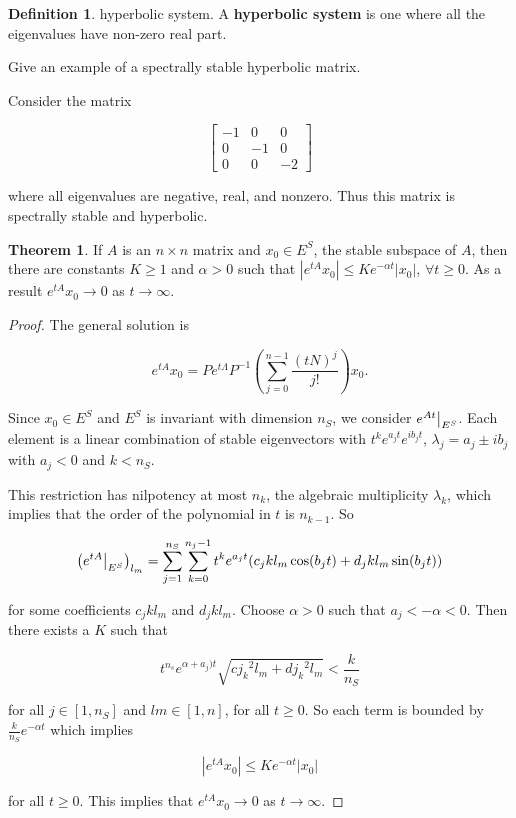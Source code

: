 \documentclass[12pt]{article}
\newcommand\restr[2]{{%
  \left.\kern-\nulldelimiterspace %
  #1 %
  \vphantom{\big|} %
  \right|_{#2} %
  }}
\theoremstyle{definition}
\newtheorem*{definition}{Definition}
\newtheorem{theorem}{Theorem}[section]  %
\begin{document}
\begin{definition} hyperbolic system.
A \textbf{hyperbolic system} is one where all the eigenvalues have non-zero real part.
\end{definition}


Give an example of a spectrally stable hyperbolic matrix.

Consider the matrix

\[
\begin{bmatrix}
-1 & 0 & 0 \\
0 & -1 & 0 \\
0 & 0 & -2
\end{bmatrix}
\]

where all eigenvalues are negative, real, and nonzero. Thus this matrix is spectrally stable and hyperbolic.


\begin{theorem}
If $A$ is an $n \times n$ matrix and $x_0 \in E^S$, the stable subspace of $A$, then
there are constants $K \geq 1$ and $\alpha > 0$ such that 
$|e^{tA} x_0| \leq Ke^{-\alpha t}|x_0|$,  $\forall t \geq 0$. As a result
$e^{tA}x_0 \rightarrow 0$ as $t \rightarrow \infty$.
\end{theorem}


\begin{proof}

The general solution is 

\[
e^{tA}x_0 = P e^{t \Lambda} P^{-1} \left( \sum_{j = 0}^{n-1} \frac{(tN)^j}{j!} \right) x_0.
\]

Since $x_0 \in E^S$ and $E^S$ is invariant with dimension $n_S$, we consider $\restr{e^{At}}{E^S}$.
Each element is a linear combination of stable eigenvectors with $t^k e^{a_j t} e^{ib_j t}$,
$\lambda_j = a_j \pm ib_j$ with $a_j < 0$ and $k < n_S$.

This restriction has nilpotency at most $n_k$, the algebraic multiplicity $\lambda_k$, which implies
that the order of the polynomial in $t$ is $n_{k-1}$. So

\[
\left( \restr{e^{tA}}{E^S} \right)_{l_m} = \sum_{j = 1}^{n_S} \sum_{k = 0}^{n_j - 1} t^k e^{a_j t} (c_j k l_m \cos (b_j t) + d_j k l_m \sin (b_j t))
\] 

for some coefficients $c_j k l_m$ and $d_j k l_m$. Choose $\alpha > 0$ such that $a_j  < -\alpha < 0$. Then
there exists a $K$ such that

\[
t^{n_s} e^{\alpha + a_j)t} \sqrt{c {j_k}^{2} l_m + d{j_k}^{2}l_m} < \frac{k}{n_S} 
\]

for all $j \in [1,n_S]$ and $lm \in [1,n]$, for all $t \geq 0$. So each term is bounded by
$\frac{k}{n_S} e^{-\alpha t}$ which implies

\[
|e^{tA}x_0| \leq Ke^{-\alpha t}|x_0|
\]

for all $t \geq 0$. This implies that $e^{tA}x_0 \rightarrow 0$ as $t \rightarrow \infty$.
\end{proof}
\end{document}
